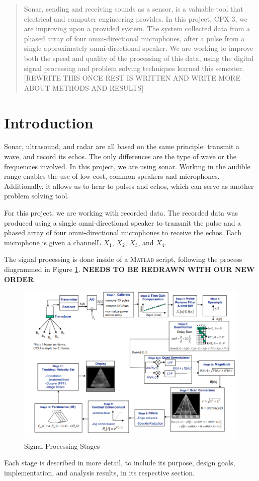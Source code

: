 

\begin{abstract}

Sonar, sending and receiving sounds as a sensor, is a valuable tool that electrical and computer engineering provides.  In this project, CPX 3, we are improving upon a provided system.  The system collected data from a phased array of four omni-directional microphones, after a pulse from a single approximately omni-directional speaker.  We are working to improve both the speed and quality of the processing of this data, using the digital signal processing and problem solving techniques learned this semester. [REWRITE THIS ONCE REST IS WRITTEN AND WRITE MORE ABOUT METHODS AND RESULTS]


\end{abstract}

\section{Introduction}

Sonar, ultrasound, and radar are all based on the same principle: transmit a wave, and record its echos.  The only differences are the type of wave or the frequencies involved.  In this project, we are using sonar.  Working in the audible range enables the use of low-cost, common speakers and microphones.  Additionally, it allows us to hear to pulses and echos, which can serve as another problem solving tool.

For this project, we are working with recorded data.  The recorded data was produced using a single omni-directional speaker to transmit the pulse and a phased array of four omni-directional microphones to receive the echos.  Each microphone is given a channelL $X_1$, $X_2$, $X_3$, and $X_4$.

The signal processing is done inside of a \textsc{Matlab} script, following the process diagrammed in Figure \ref{fig:stages}. \textbf{NEEDS TO BE REDRAWN WITH OUR NEW ORDER}

\begin{figure}[H]
    \centering
    \includegraphics[width=0.75\linewidth]{figures/stages.png}
    \caption{Signal Processing Stages}
    \label{fig:stages}
\end{figure}

Each stage is described in more detail, to include its purpose, design goals, implementation, and analysis results, in its respective section.